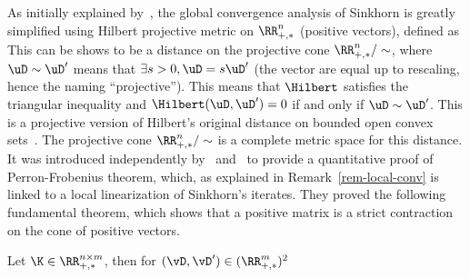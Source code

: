 \begin{rem}
As initially explained by~\cite{franklin1989scaling}, the global convergence analysis of Sinkhorn is greatly simplified using Hilbert projective metric on $\RR_{+,*}^n$ (positive vectors), defined as
This can be shows to be a distance on the projective cone $\RR_{+,*}^n/\sim$, where $\uD \sim \uD'$ means that $\exists s>0, \uD=s\uD'$ (the vector are equal up to rescaling, hence the naming ``projective'').  
%
This means that $\Hilbert$ satisfies the triangular inequality and $\Hilbert(\uD,\uD')=0$ if and only if $\uD \sim \uD'$. 
%
This is a projective version of Hilbert's original distance on bounded open convex sets~\cite{hilbert1895gerade}.
%
The projective cone $\RR_{+,*}^n/\sim$ is a complete metric space for this distance. 
%
It was introduced independently by~\cite{birkhoff1957extensions} and~\cite{samelson1957perron} to provide a quantitative proof of Perron-Frobenius theorem, which, as explained in Remark~\ref{rem-local-conv} is linked to a local linearization of Sinkhorn's iterates. They proved the following fundamental theorem, which shows that a positive matrix is a strict contraction on the cone of positive vectors.

\begin{thm}\label{thm-birkoff}
	Let $\K \in \RR_{+,*}^{n \times m}$, then for $(\vD,\vD') \in (\RR_{+,*}^m)^2$
\end{thm}
\end{rem}

